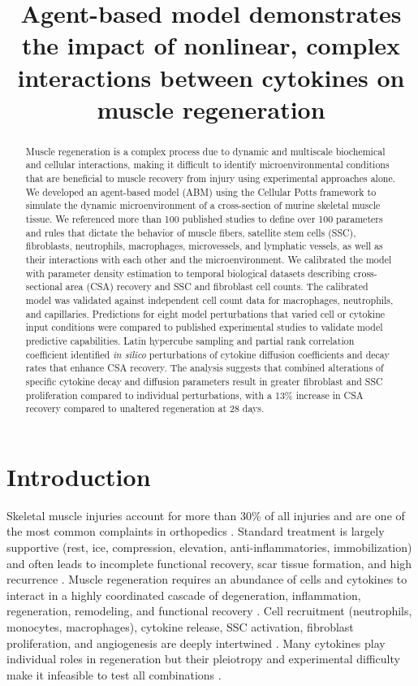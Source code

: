 \documentclass[11pt]{article}
\title{Agent-based model demonstrates the impact of nonlinear, complex interactions between cytokines on muscle regeneration}
\author{}
\date{}
\begin{document}
\maketitle

\begin{abstract}
Muscle regeneration is a complex process due to dynamic and multiscale biochemical and cellular interactions, making it difficult to identify microenvironmental conditions that are beneficial to muscle recovery from injury using experimental approaches alone. We developed an agent-based model (ABM) using the Cellular Potts framework to simulate the dynamic microenvironment of a cross-section of murine skeletal muscle tissue. We referenced more than 100 published studies to define over 100 parameters and rules that dictate the behavior of muscle fibers, satellite stem cells (SSC), fibroblasts, neutrophils, macrophages, microvessels, and lymphatic vessels, as well as their interactions with each other and the microenvironment. We calibrated the model with parameter density estimation to temporal biological datasets describing cross-sectional area (CSA) recovery and SSC and fibroblast cell counts. The calibrated model was validated against independent cell count data for macrophages, neutrophils, and capillaries. Predictions for eight model perturbations that varied cell or cytokine input conditions were compared to published experimental studies to validate model predictive capabilities. Latin hypercube sampling and partial rank correlation coefficient identified \textit{in silico} perturbations of cytokine diffusion coefficients and decay rates that enhance CSA recovery. The analysis suggests that combined alterations of specific cytokine decay and diffusion parameters result in greater fibroblast and SSC proliferation compared to individual perturbations, with a 13\% increase in CSA recovery compared to unaltered regeneration at 28 days.
\end{abstract}

\section{Introduction}
Skeletal muscle injuries account for more than 30\% of all injuries and are one of the most common complaints in orthopedics \citep{r1,r2,r3}. Standard treatment is largely supportive (rest, ice, compression, elevation, anti-inflammatories, immobilization) \citep{r1} and often leads to incomplete functional recovery, scar tissue formation, and high recurrence \citep{r4,r5}. Muscle regeneration requires an abundance of cells and cytokines to interact in a highly coordinated cascade of degeneration, inflammation, regeneration, remodeling, and functional recovery \citep{r6}. Cell recruitment (neutrophils, monocytes, macrophages), cytokine release, SSC activation, fibroblast proliferation, and angiogenesis are deeply intertwined \citep{r7,r8,r9}. Many cytokines play individual roles in regeneration \citep{r10,r11,r12} but their pleiotropy and experimental difficulty make it infeasible to test all combinations \citep{r13,r14}.
\end{document}
